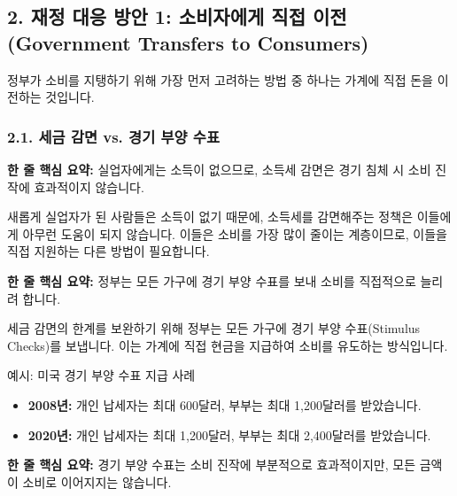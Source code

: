 \documentclass[11pt,a4paper]{article}
\theoremstyle{definition}
\begin{document}
\subsection{2. 재정 대응 방안 1: 소비자에게 직접 이전 (Government Transfers to Consumers)}

정부가 소비를 지탱하기 위해 가장 먼저 고려하는 방법 중 하나는 가계에 직접 돈을 이전하는 것입니다.

\subsubsection*{2.1. 세금 감면 vs. 경기 부양 수표}

\begin{tcolorbox}[mybox={세금 감면의 한계}]
    \textbf{한 줄 핵심 요약:} 실업자에게는 소득이 없으므로, 소득세 감면은 경기 침체 시 소비 진작에 효과적이지 않습니다.
\end{tcolorbox}

새롭게 실업자가 된 사람들은 소득이 없기 때문에, 소득세를 감면해주는 정책은 이들에게 아무런 도움이 되지 않습니다. 이들은 소비를 가장 많이 줄이는 계층이므로, 이들을 직접 지원하는 다른 방법이 필요합니다.

\begin{tcolorbox}[mybox={경기 부양 수표의 도입}]
    \textbf{한 줄 핵심 요약:} 정부는 모든 가구에 경기 부양 수표를 보내 소비를 직접적으로 늘리려 합니다.
\end{tcolorbox}

세금 감면의 한계를 보완하기 위해 정부는 모든 가구에 경기 부양 수표(Stimulus Checks)를 보냅니다. 이는 가계에 직접 현금을 지급하여 소비를 유도하는 방식입니다.

\begin{examplebox}{예시: 미국 경기 부양 수표 지급 사례}
    \begin{itemize}
        \item \textbf{2008년:} 개인 납세자는 최대 600달러, 부부는 최대 1,200달러를 받았습니다.
        \item \textbf{2020년:} 개인 납세자는 최대 1,200달러, 부부는 최대 2,400달러를 받았습니다.
    \end{itemize}
\end{examplebox}

\begin{tcolorbox}[mybox={경기 부양 수표의 효과성}]
    \textbf{한 줄 핵심 요약:} 경기 부양 수표는 소비 진작에 부분적으로 효과적이지만, 모든 금액이 소비로 이어지지는 않습니다.
\end{tcolorbox}
\end{document}

